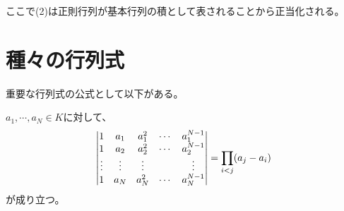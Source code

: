 ここで(2)は正則行列が基本行列の積として表されることから正当化される。

\begin{example}
\end{example}

\section{種々の行列式}

重要な行列式の公式として以下がある。

\begin{theorem}[ヴァンデルモンドの行列式]
$a_1, \cdots, a_N \in K$に対して、
$$
\mqty|
1 & a_1 & a_1^2 & \cdots & a_1^{N-1} \\
1 & a_2 & a_2^2 & \cdots & a_2^{N-1} \\
\vdots & \vdots & \vdots & & \vdots \\
1 & a_N & a_N^2 & \cdots & a_N^{N-1} \\
|
= \prod_{i < j}(a_j-a_i)
$$
が成り立つ。
\end{theorem}

